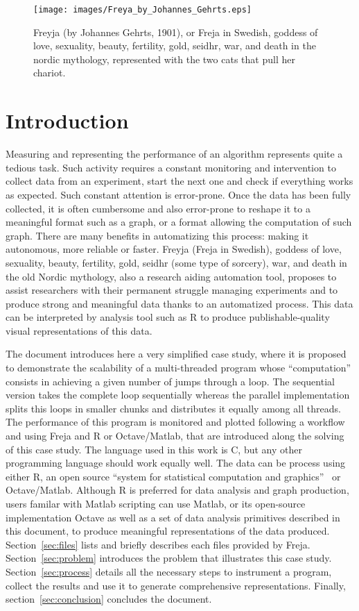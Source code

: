 
\begin{figure}[h]
\centering
\texttt{[image: images/Freya\_by\_Johannes\_Gehrts.eps]}
\caption{Freyja (by Johannes Gehrts, 1901), or Freja in Swedish, goddess of love, sexuality, beauty, fertility, gold, seidhr, war, and death in the nordic mythology, represented with the two cats that pull her chariot.}
\end{figure}

\section{Introduction}
Measuring and representing the performance of an algorithm represents quite a tedious task. Such activity requires a constant monitoring and intervention to collect data from an experiment, start the next one and check if everything works as expected.
Such constant attention is error-prone. Once the data has been fully collected, it is often cumbersome and also error-prone to reshape it to a meaningful format such as a graph, or a format allowing the computation of such graph.
There are many benefits in automatizing this process: making it autonomous, more reliable or faster.
Freyja (Freja in Swedish), goddess of love, sexuality, beauty, fertility, gold, seidhr (some type of sorcery), war, and death in the old Nordic mythology, also a research aiding automation tool, proposes to assist researchers with their permanent struggle managing experiments and to produce strong and meaningful data thanks to an automatized process. This data can be interpreted by analysis tool such as R to produce publishable-quality visual representations of this data. 

The document introduces here a very simplified case study, where it is proposed to demonstrate the scalability of a multi-threaded program whose ``computation'' consists in achieving a given number of jumps through a loop. The sequential version takes the complete loop sequentially whereas the parallel implementation splits this loops in smaller chunks and distributes it equally among all threads. The performance of this program is monitored and plotted following a workflow and using Freja and R or Octave/Matlab, that are introduced along the solving of this case study. The language used in this work is {C}, but any other programming language should work equally well. The data can be process using either R, an open source ``system for statistical computation and graphics''~\cite{hornik14} or Octave/Matlab. Although R is preferred for data analysis and graph production, users familar with Matlab scripting can use Matlab, or its open-source implementation Octave as well as a set of data analysis primitives described in this document, to produce meaningful representations of the data produced. Section~\ref{sec:files} lists and briefly describes each files provided by Freja. Section~\ref{sec:problem} introduces the problem that illustrates this case study. Section~\ref{sec:process} details all the necessary steps to instrument a program, collect the results and use it to generate comprehensive representations. Finally, section~\ref{sec:conclusion} concludes the document.


